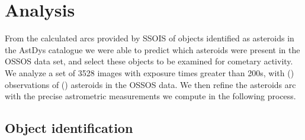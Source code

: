 \documentclass[iop,apj]{emulateapj}
\begin{document}

\section{Analysis}

From the calculated arcs provided by SSOIS \citep{ssois} of objects identified as asteroids in the AstDys catalogue \citep{astdys} we were able to predict which asteroids were present in the OSSOS data set, and select these objects to be examined for cometary activity. We analyze a set of 3528 images with exposure times greater than 200s, with () observations of () asteroids in the OSSOS data. We then refine the asteroids arc with the precise astrometric measurements we compute in the following process.

\subsection{Object identification}
\end{document}
